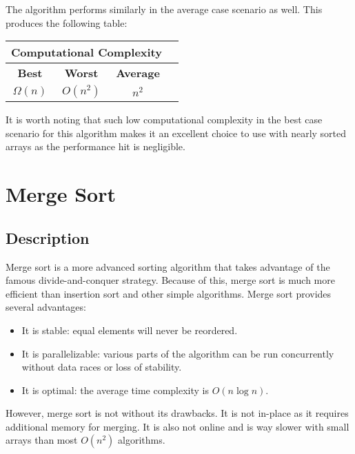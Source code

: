 \documentclass[titlepage, a4paper, 12pt]{article}
\begin{document}
    The algorithm performs similarly in the average case scenario as well. This produces the following table:

    \begin{table}[h]
        \centering
        \begin{tabular}{|c|c|c|c|}
            \hline
            \multicolumn{3}{|c|}{Computational Complexity} \\
            \hline
            \textbf{Best} & \textbf{Worst} & \textbf{Average} \\
            \hline
            \small$\Omega(n)$ & \small$O(n^2)$ & \small$n^2$ \\
            \hline
        \end{tabular}
    \end{table}

    It is worth noting that such low computational complexity in the best case scenario for this algorithm makes it an excellent choice to use with nearly sorted arrays as the performance hit is negligible.

    \clearpage
    \section{Merge Sort}

    \subsection{Description}

    Merge sort is a more advanced sorting algorithm that takes advantage of the famous divide-and-conquer strategy. Because of this, merge sort is much more efficient than insertion sort and other simple algorithms. Merge sort provides several advantages:

    \begin{itemize}
        \item It is stable: equal elements will never be reordered.
        \item It is parallelizable: various parts of the algorithm can be run concurrently without data races or loss of stability.
        \item It is optimal: the average time complexity is $O(n \log n)$.
    \end{itemize}

    However, merge sort is not without its drawbacks. It is not in-place as it requires additional memory for merging. It is also not online and is way slower with small arrays than most $O(n^2)$ algorithms.
\end{document}
